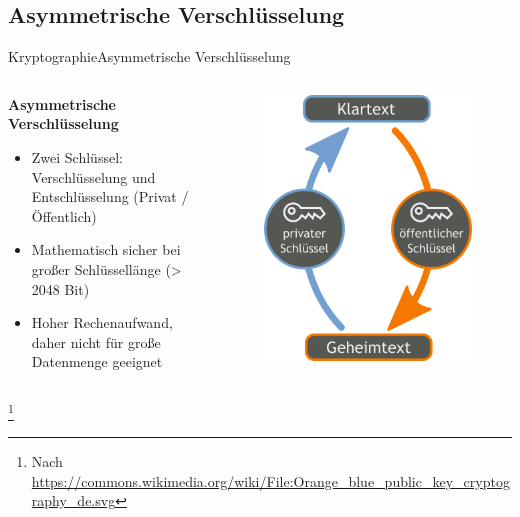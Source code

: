 \documentclass[10pt]{beamer}
\begin{document}
\subsection{Asymmetrische Verschlüsselung}
\begin{frame}{Kryptographie}{Asymmetrische Verschlüsselung}


	\begin{columns}
		\begin{column}{6cm}
			\textbf{Asymmetrische Verschlüsselung}
			\begin{itemize}
				\item Zwei Schlüssel: Verschlüsselung und Entschlüsselung (Privat / Öffentlich)
				\item Mathematisch sicher bei großer Schlüssellänge (> 2048 Bit)
				\item Hoher Rechenaufwand, daher nicht für große Datenmenge geeignet
			\end{itemize}
		\end{column}
		\begin{column}{5cm}
			\begin{figure}[p]
				\centering
				\includegraphics[scale=0.25]{AsymKrypto.png}
			\end{figure}
		\end{column}
	\end{columns}
	\let\thefootnote\relax\footnote{Nach \url{https://commons.wikimedia.org/wiki/File:Orange_blue_public_key_cryptography_de.svg}}
\end{frame}
\end{document}
